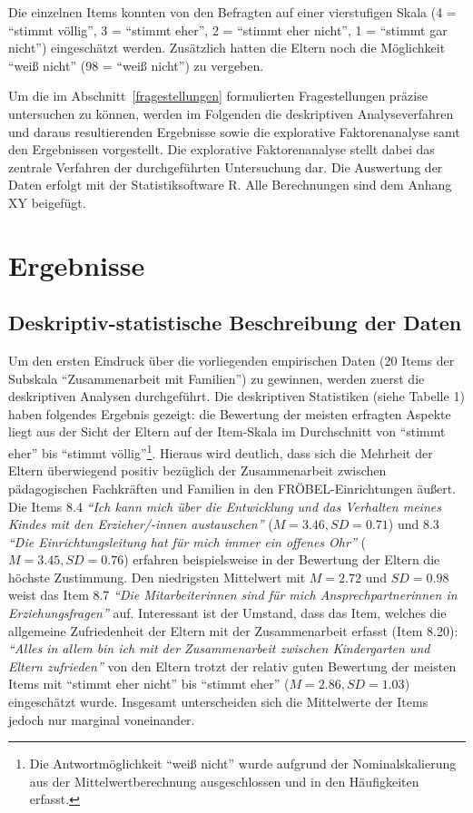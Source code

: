 \documentclass[12pt,a4paper]{article}
\begin{document}
	Die einzelnen Items konnten von den Befragten auf einer vierstufigen Skala (4 = "`stimmt völlig"', 3 = "`stimmt eher"', 2 = "`stimmt eher nicht"', 1 = "`stimmt gar nicht"') eingeschätzt werden. Zusätzlich hatten die Eltern noch die Möglichkeit "`weiß nicht"' (98 = "`weiß nicht"') zu vergeben.
	   
	Um die im Abschnitt~\ref{fragestellungen} formulierten Fragestellungen präzise untersuchen zu können, werden im Folgenden die deskriptiven Analyseverfahren und daraus resultierenden Ergebnisse sowie die explorative Faktorenanalyse samt den Ergebnissen vorgestellt. Die explorative Faktorenanalyse stellt dabei das zentrale Verfahren der durchgeführten Untersuchung dar. Die Auswertung der Daten erfolgt mit der Statistiksoftware R. Alle Berechnungen sind dem Anhang XY beigefügt. %
\pagebreak
\section{Ergebnisse}  
\subsection{Deskriptiv-statistische Beschreibung der Daten}

Um den ersten Eindruck über die vorliegenden empirischen Daten (20 Items der Subskala "`Zusammenarbeit mit Familien"') zu gewinnen, werden zuerst die deskriptiven Analysen durchgeführt. Die deskriptiven Statistiken (siehe Tabelle 1) haben folgendes Ergebnis gezeigt: die Bewertung der meisten erfragten Aspekte liegt aus der Sicht der Eltern auf der Item-Skala im Durchschnitt von "`stimmt eher"' bis "`stimmt völlig"'\footnote{Die Antwortmöglichkeit "`weiß nicht"' wurde aufgrund der Nominalskalierung aus der Mittelwertberechnung ausgeschlossen und in den Häufigkeiten erfasst.}. Hieraus wird deutlich, dass sich die Mehrheit der Eltern überwiegend positiv bezüglich der Zusammenarbeit zwischen pädagogischen Fachkräften und Familien in den FRÖBEL-Einrichtungen äußert. Die Items 8.4 \textit{"`Ich kann mich über die Entwicklung und das Verhalten meines Kindes mit den Erzieher/-innen austauschen"'} ($M = 3.46, SD = 0.71$) und 8.3 \textit{"`Die Einrichtungsleitung hat für mich immer ein offenes Ohr"'} ($M = 3.45, SD = 0.76$) erfahren beispielsweise in der Bewertung der Eltern die höchste Zustimmung. Den niedrigsten Mittelwert mit $M = 2.72$ und $SD = 0.98$ weist das Item 8.7 \textit{"`Die Mitarbeiterinnen sind für mich Ansprechpartnerinnen in Erziehungsfragen"'} auf. Interessant ist der Umstand, dass das Item, welches die allgemeine Zufriedenheit der Eltern mit der Zusammenarbeit erfasst (Item 8.20): \textit{"`Alles in allem bin ich mit der Zusammenarbeit zwischen Kindergarten und Eltern zufrieden"'} von den Eltern trotzt der relativ guten Bewertung der meisten Items mit "`stimmt eher nicht"' bis "`stimmt eher"' ($M = 2.86, SD = 1.03$) eingeschätzt wurde. Insgesamt unterscheiden sich die Mittelwerte der Items jedoch nur marginal voneinander.
\end{document}
